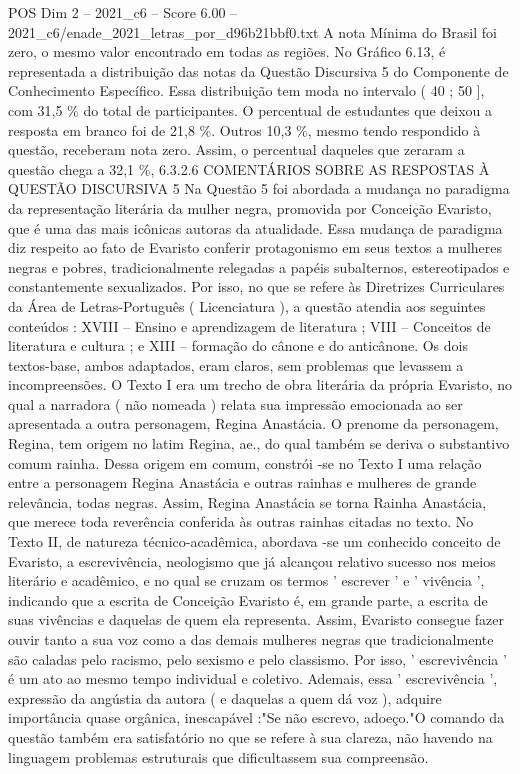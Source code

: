 \begin{textsample}{POS Dim 2 – 2021\_c6 – Score 6.00 – 2021\_c6/enade\_2021\_letras\_por\_d96b21bbf0.txt}
A nota Mínima do Brasil foi zero, o mesmo valor encontrado em todas as regiões.
No Gráfico 6.13, é representada a distribuição das notas da Questão Discursiva 5 do Componente de Conhecimento Específico.
Essa distribuição tem moda no intervalo ( 40 ; 50 ], com 31,5 \% do total de participantes.
O percentual de estudantes que deixou a resposta em branco foi de 21,8 \%.
Outros 10,3 \%, mesmo tendo respondido à questão, receberam nota zero.
Assim, o percentual daqueles que zeraram a questão chega a 32,1 \%, 6.3.2.6 COMENTÁRIOS SOBRE AS RESPOSTAS À QUESTÃO DISCURSIVA 5 Na Questão 5 foi abordada a mudança no paradigma da representação literária da mulher negra, promovida por Conceição Evaristo, que é uma das mais icônicas autoras da atualidade.
Essa mudança de paradigma diz respeito ao fato de Evaristo conferir protagonismo em seus textos a mulheres negras e pobres, tradicionalmente relegadas a papéis subalternos, estereotipados e constantemente sexualizados.
Por isso, no que se refere às Diretrizes Curriculares da Área de Letras-Português ( Licenciatura ), a questão atendia aos seguintes conteúdos : XVIII – Ensino e aprendizagem de literatura ; VIII – Conceitos de literatura e cultura ; e XIII – formação do cânone e do anticânone.
Os dois textos-base, ambos adaptados, eram claros, sem problemas que levassem a incompreensões.
O Texto I era um trecho de obra literária da própria Evaristo, no qual a narradora ( não nomeada ) relata sua impressão emocionada ao ser apresentada a outra personagem, Regina Anastácia.
O prenome da personagem, Regina, tem origem no latim Regina, ae., do qual também se deriva o substantivo comum rainha.
Dessa origem em comum, constrói -se no Texto I uma relação entre a personagem Regina Anastácia e outras rainhas e mulheres de grande relevância, todas negras.
Assim, Regina Anastácia se torna Rainha Anastácia, que merece toda reverência conferida às outras rainhas citadas no texto.
No Texto II, de natureza técnico-acadêmica, abordava -se um conhecido conceito de Evaristo, a escrevivência, neologismo que já alcançou relativo sucesso nos meios literário e acadêmico, e no qual se cruzam os termos ' escrever ' e ' vivência ', indicando que a escrita de Conceição Evaristo é, em grande parte, a escrita de suas vivências e daquelas de quem ela representa.
Assim, Evaristo consegue fazer ouvir tanto a sua voz como a das demais mulheres negras que tradicionalmente são caladas pelo racismo, pelo sexismo e pelo classismo.
Por isso, ' escrevivência ' é um ato ao mesmo tempo individual e coletivo.
Ademais, essa ' escrevivência ', expressão da angústia da autora ( e daquelas a quem dá voz ), adquire importância quase orgânica, inescapável :"Se não escrevo, adoeço."O comando da questão também era satisfatório no que se refere à sua clareza, não havendo na linguagem problemas estruturais que dificultassem sua compreensão.

\end{textsample}
